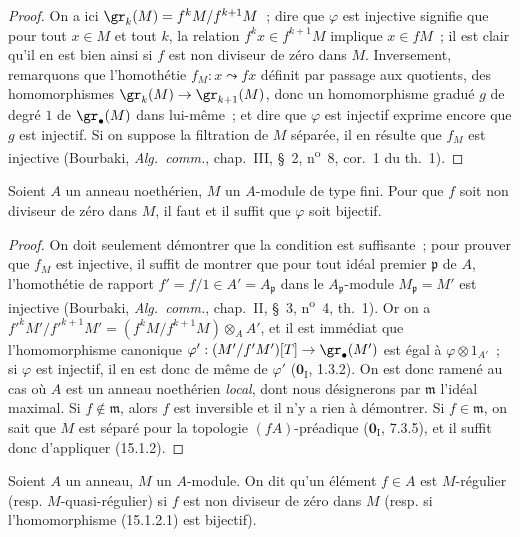 \begin{proof}
On a ici $\gr_k(M)=f^kM/f^{k+1}M$~; dire que $\varphi$ est injective signifie
que pour tout $x\in M$ et tout $k$, la relation $f^kx\in f^{k+1}M$ implique
$x\in fM$~; il est clair qu'il en est bien ainsi si $f$ est non diviseur de
zéro dans $M$. Inversement, remarquons que l'homothétie
$f_M:x\leadsto fx$ définit par passage aux quotients, des homomorphismes
$\gr_k(M)\to\gr_{k+1}(M)$, donc un homomorphisme gradué $g$ de degré $1$ de
$\gr_\bullet(M)$ dans lui-même~; et dire que $\varphi$ est injectif exprime
encore que $g$ est injectif. Si on suppose la filtration de $M$ séparée, il en
résulte que $f_M$ est injective (Bourbaki, \emph{Alg.~comm.}, chap.~III,
\S~2, n\textsuperscript{o}~8, cor.~1 du th.~1).
\end{proof}

\begin{corollary}[15.1.3]
\label{0.15.1.3-fr}
Soient $A$ un anneau noethérien, $M$ un $A$-module de type fini. Pour que $f$
soit non diviseur de zéro dans $M$, il faut et il suffit que $\varphi$ soit
bijectif.
\end{corollary}

\begin{proof}
On doit seulement démontrer que la condition est suffisante~; pour prouver
que $f_M$ est injective, il suffit de montrer que pour tout idéal premier
$\mathfrak p$ de $A$, l'homothétie de rapport
$f'=f/1\in A'=A_{\mathfrak p}$ dans le $A_{\mathfrak p}$-module
$M_{\mathfrak p}=M'$ est injective (Bourbaki, \emph{Alg.~comm.}, chap.~II,
\S~3, n\textsuperscript{o}~4, th.~1). Or on a
$f'^kM'/f'^{k+1}M'=(f^kM/f^{k+1}M)\otimes_A A'$, et il est immédiat que
l'homomorphisme canonique
$\varphi':(M'/f'M')[T]\to\gr_\bullet(M')$ est égal à
$\varphi\otimes 1_{A'}$~; si $\varphi$ est injectif, il en est donc de même de
$\varphi'$ ($\mathbf{0}_{\mathrm I}$, 1.3.2). On est donc ramené au cas où $A$ est un
anneau noethérien \emph{local}, dont nous désignerons par $\mathfrak m$
l'idéal maximal. Si $f\notin\mathfrak m$, alors $f$ est inversible et il n'y a
rien à démontrer. Si $f\in\mathfrak m$, on sait que $M$ est séparé pour la
topologie $(fA)$-préadique ($\mathbf{0}_{\mathrm I}$, 7.3.5), et il suffit donc
d'appliquer (15.1.2).
\end{proof}

\begin{definition}[15.1.4]
\label{0.15.1.4-fr}
Soient $A$ un anneau, $M$ un $A$-module. On dit qu'un élément $f\in A$ est
$M$-régulier (\textup{resp.} $M$-quasi-régulier) si $f$ est non diviseur
de zéro dans $M$ (\textup{resp.} si l'homomorphisme (15.1.2.1) est bijectif).
\end{definition}

